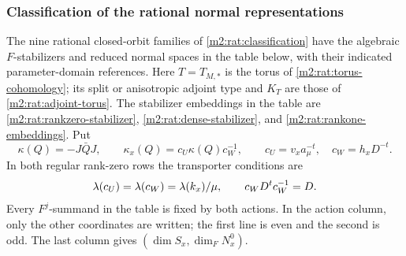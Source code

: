 \subsubsection{Classification of the rational normal representations}

\begin{theorem}\label{m2:nor:classification}
The nine rational closed-orbit families of \cref{m2:rat:classification}
have the algebraic $F$-stabilizers and reduced normal spaces
in the table below, with their indicated parameter-domain references.
Here $T=T_{M,*}$ is the torus of \cref{m2:rat:torus-cohomology}; its
split or anisotropic adjoint type and $K_T$ are those of
\cref{m2:rat:adjoint-torus}. The stabilizer embeddings in the table are \eqref{m2:rat:rankzero-stabilizer}, \eqref{m2:rat:dense-stabilizer},
and \eqref{m2:rat:rankone-embeddings}. Put
\[
 \kappa(Q)=-J\bar QJ,\qquad
 \kappa_x(Q)=c_U\kappa(Q)c_W^{-1},\qquad
 c_U=v_xa_\mu^{-t},\quad c_W=h_xD^{-t}.
\]
In both regular rank-zero rows the transporter conditions are
\begin{equation}\label{m2:nor:table-transport-conditions}
 \lambda(c_U)=\lambda(c_W)=\lambda(k_x)/\mu,\qquad
 c_WD^tc_W^{-1}=D.
\end{equation}
Every $F^j$-summand in the table is fixed by both actions. In the action column,
only the other coordinates are written; the first line is even
and the second is odd. The last column gives
$(\dim S_x,\dim_F N_x^0)$.


\end{theorem}

